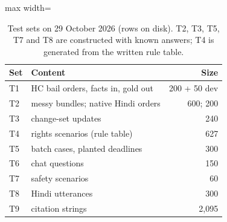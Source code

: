 \begin{table}[!t]
\centering\small
\begin{adjustbox}{max width=\textwidth}
\begin{tabular}{@{}llr@{}}
\toprule
Set & Content & Size \\
\midrule
T1 & HC bail orders, facts in, gold out & 200 + 50 dev \\
T2 & messy bundles; native Hindi orders & 600; 200 \\
T3 & change-set updates & 240 \\
T4 & rights scenarios (rule table) & 627 \\
T5 & batch cases, planted deadlines & 300 \\
T6 & chat questions & 150 \\
T7 & safety scenarios & 60 \\
T8 & Hindi utterances & 300 \\
T9 & citation strings & 2,095 \\
\bottomrule
\end{tabular}
\end{adjustbox}
\caption{Test sets on 29 October 2026 (rows on disk). T2, T3, T5, T7 and T8 are constructed with known answers; T4 is generated from the written rule table.}
\label{tab:data}
\end{table}
